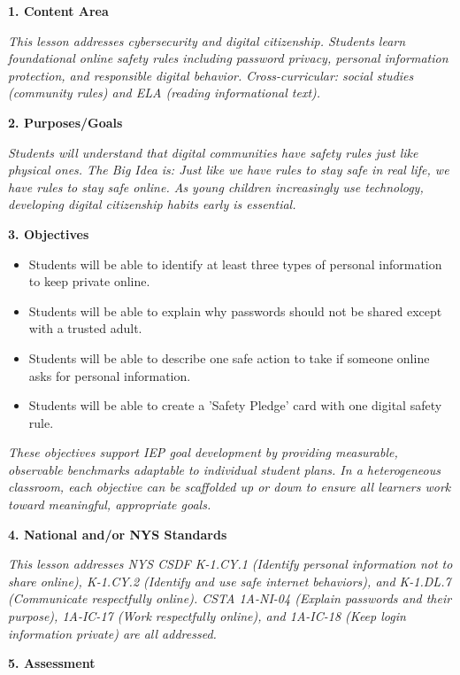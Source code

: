 \documentclass[11pt,letterpaper]{article}
\begin{document}
\textbf{1. Content Area}

\textit{This lesson addresses cybersecurity and digital citizenship. Students learn foundational online safety rules including password privacy, personal information protection, and responsible digital behavior. Cross-curricular: social studies (community rules) and ELA (reading informational text).}

\textbf{2. Purposes/Goals}

\textit{Students will understand that digital communities have safety rules just like physical ones. The Big Idea is: Just like we have rules to stay safe in real life, we have rules to stay safe online. As young children increasingly use technology, developing digital citizenship habits early is essential.}

\textbf{3. Objectives}

\begin{itemize}
  \item Students will be able to identify at least three types of personal information to keep private online.

  \item Students will be able to explain why passwords should not be shared except with a trusted adult.

  \item Students will be able to describe one safe action to take if someone online asks for personal information.

  \item Students will be able to create a 'Safety Pledge' card with one digital safety rule.
\end{itemize}

\textit{These objectives support IEP goal development by providing measurable, observable benchmarks adaptable to individual student plans. In a heterogeneous classroom, each objective can be scaffolded up or down to ensure all learners work toward meaningful, appropriate goals.}

\textbf{4. National and/or NYS Standards}

\textit{This lesson addresses NYS CSDF K-1.CY.1 (Identify personal information not to share online), K-1.CY.2 (Identify and use safe internet behaviors), and K-1.DL.7 (Communicate respectfully online). CSTA 1A-NI-04 (Explain passwords and their purpose), 1A-IC-17 (Work respectfully online), and 1A-IC-18 (Keep login information private) are all addressed.}


\newpage
\textbf{5. Assessment}
\end{document}
